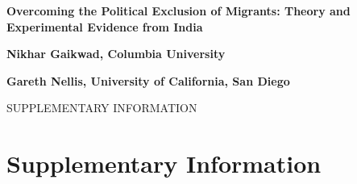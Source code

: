 \documentclass[
  11.5pt,
]{article}
\begin{document}
\clearpage

\setcounter{section}{0}

\begin{center}
\Large{\textbf{Overcoming the Political Exclusion of Migrants: Theory and Experimental Evidence from India}}
\end{center}

\vspace{20pt}

\begin{center}
\large{\textbf{Nikhar Gaikwad, Columbia University}}
\end{center}

\begin{center}
\large{\textbf{Gareth Nellis, University of California, San Diego}}
\end{center}

\vspace{20pt}

\begin{center}
\huge{SUPPLEMENTARY INFORMATION}
\end{center}

\setcounter{page}{0}
\setcounter{page}{1}
\setcounter{figure}{0}
\setcounter{table}{0}
\renewcommand{\thefigure}{SI\arabic{figure}}
\renewcommand{\thetable}{SI\arabic{table}}

\newpage

\part*{Supplementary Information}
\localtableofcontents

\clearpage
\end{document}

